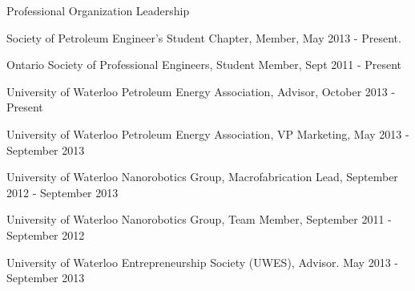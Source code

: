 \documentclass{resume} %
\begin{document}

\begin{rSection}{Professional Organization Leadership}

\item Society of Petroleum Engineer's Student Chapter, Member, May 2013 - Present.
\item Ontario Society of Professional Engineers, Student Member, Sept 2011 - Present
\item University of Waterloo Petroleum Energy Association, Advisor,  October 2013 - Present
\item University of Waterloo Petroleum Energy Association, VP Marketing, May 2013 - September 2013
\item University of Waterloo Nanorobotics Group, Macrofabrication Lead, September 2012 - September 2013
\item University of Waterloo Nanorobotics Group, Team Member, September 2011 - September 2012
\item University of Waterloo Entrepreneurship Society (UWES), Advisor. May 2013 - September 2013

\end{rSection}	



\end{document}
